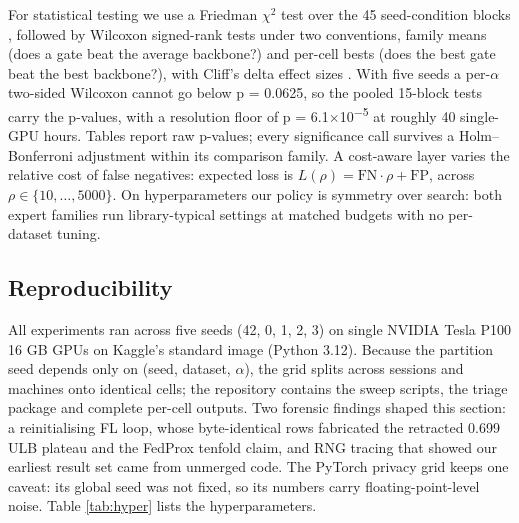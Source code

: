 \documentclass[a4paper, 10pt, conference]{ieeeconf}
\begin{document}
For statistical testing we use a Friedman $\chi^2$ test over the 45
seed-condition blocks \cite{r28}, followed by Wilcoxon signed-rank tests under
two conventions, family means (does a gate beat the average backbone?) and
per-cell bests (does the best gate beat the best backbone?), with Cliff's delta
effect sizes \cite{r27}. With five seeds a per-$\alpha$ two-sided Wilcoxon
cannot go below p = 0.0625, so the pooled 15-block tests carry the p-values,
with a resolution floor of p = 6.1$\times$10\textsuperscript{$-$5} at roughly 40
single-GPU hours. Tables report raw p-values; every significance call survives a
Holm--Bonferroni adjustment within its comparison family. A cost-aware layer
varies the relative cost of false negatives: expected loss is
$L(\rho) = \mathrm{FN} \cdot \rho + \mathrm{FP}$, across
$\rho \in \{10, \ldots, 5000\}$. On hyperparameters our policy is symmetry over
search: both expert families run library-typical settings at matched budgets
with no per-dataset tuning.

\subsection{Reproducibility}
All experiments ran across five seeds (42, 0, 1, 2, 3) on single NVIDIA Tesla
P100 16 GB GPUs on Kaggle's standard image (Python 3.12). Because the partition
seed depends only on (seed, dataset, $\alpha$), the grid splits across sessions
and machines onto identical cells; the repository contains the sweep scripts,
the triage package and complete per-cell outputs. Two forensic findings shaped
this section: a reinitialising FL loop, whose byte-identical rows fabricated the
retracted 0.699 ULB plateau and the FedProx tenfold claim, and RNG tracing that
showed our earliest result set came from unmerged code. The PyTorch privacy grid
keeps one caveat: its global seed was not fixed, so its numbers carry
floating-point-level noise. Table \ref{tab:hyper} lists the hyperparameters.
\end{document}
